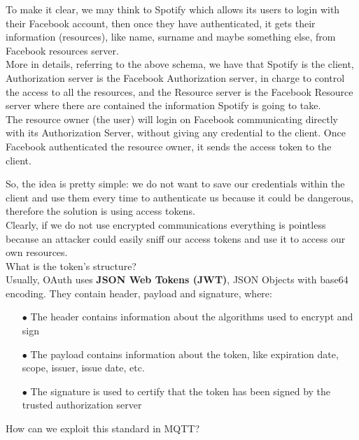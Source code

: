 \documentclass[12pt]{report}
\begin{document}
{To make it clear, we may think to Spotify which allows its users to login with their Facebook account, then once they have authenticated, it gets their information (resources), like name, surname and maybe something else, from Facebook resources server.\\
More in details, referring to the above schema, we have that Spotify is the client, Authorization server is the Facebook Authorization server, in charge to control the access to all the resources, and the Resource server is the Facebook Resource server where there are contained the information Spotify is going to take.\\
The resource owner (the user) will login on Facebook communicating directly with its Authorization Server, without giving any credential to the client. Once Facebook authenticated the resource owner, it sends the access token to the client.

So, the idea is pretty simple: we do not want to save our credentials within the client and use them every time to authenticate us because it could be dangerous, therefore the solution is using access tokens.\\
Clearly, if we do not use encrypted communications everything is pointless because an attacker could easily sniff our access tokens and use it to access our own resources.\\

What is the token's structure?\\

Usually, OAuth uses \textbf{JSON Web Tokens (JWT)}, JSON Objects with base64 encoding. They contain header, payload and signature, where:

\begin{itemize}
\setlength{\itemindent}{+4mm}
  \item[$\bullet$] The header contains information about the algorithms used to encrypt and sign
  \item[$\bullet$] The payload contains information about the token, like expiration date, scope, issuer, issue date, etc.
  \item[$\bullet$] The signature is used to certify that the token has been signed by the trusted authorization server
  \end{itemize}

How can we exploit this standard in MQTT?\\

}
\end{document}
